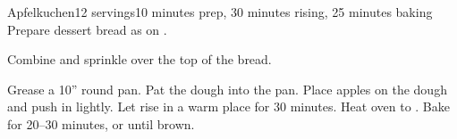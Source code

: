 \documentclass[../Cookbook.tex]{subfiles}
\begin{document}
\begin{recipe}[Apfelkuchen]{Apfelkuchen}{12 servings}{10 minutes prep, 30 minutes rising, 25 minutes baking}
	Prepare dessert bread as on .

	Combine and sprinkle over the top of the bread.
	
	Grease a 10'' round pan.
	Pat the dough into the pan.
	Place apples on the dough and push in lightly.
	Let rise in a warm place for 30 minutes.
	Heat oven to .
	Bake for 20--30 minutes, or until brown.
\end{recipe}
\end{document}
